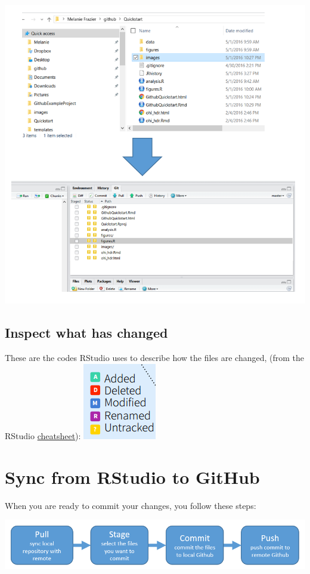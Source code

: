 \documentclass[]{book}
\theoremstyle{definition}
\theoremstyle{definition}
\theoremstyle{definition}
\theoremstyle{remark}
\begin{document}
\includegraphics{img/modify_files.png}

\subsection{Inspect what has changed}\label{inspect-what-has-changed}

These are the codes RStudio uses to describe how the files are changed,
(from the RStudio
\href{http://www.rstudio.com/wp-content/uploads/2016/01/rstudio-IDE-cheatsheet.pdf}{cheatsheet}):
\includegraphics{img/modified.png}

\section{Sync from RStudio to GitHub}\label{sync-from-rstudio-to-github}

When you are ready to commit your changes, you follow these steps:

\includegraphics{img/commit_overview.png}
\end{document}
